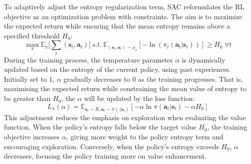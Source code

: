 To adaptively adjust the entropy regularization term, SAC reformulates the RL objective as an optimization problem with constraints. The aim is to maximize the expected return while ensuring that the mean entropy remains above a specified threshold $H_0$: $$\max_\pi\mathbb{E}_\pi \bigg[\sum_t (\mathbf{s}_t, \mathbf{a}_t)\bigg]\:s.t.\:\mathbb{E}_{(\mathbf{s}_t, \mathbf{a}_t)\sim\rho_\pi}[-\ln (\pi_t(\mathbf{a}_t|\mathbf{s}_t))] \geq H_0\;\forall t$$ During the training process, the temperature parameter $\alpha$ is dynamically updated based on the entropy of the current policy, using past experiences. Initially set to 1, $\alpha$ gradually decreases to 0 as the training progresses. That is, maximising the expected return while constraining the mean value of entropy to be greater than $H_0$, the $\alpha$ will be updated by the loss function: $$L_\pi(\alpha) = \mathbb{E}_{\mathbf{s}_t\sim R, \mathbf{a}_t\sim\pi(\cdot|\mathbf{s}_t)} [-\alpha\ln\pi(\mathbf{a}_t|\mathbf{s}_t)-\alpha H_0]$$ This adjustment reduces the emphasis on exploration when evaluating the value function. When the policy's entropy falls below the target value $H_0$, the training objective increases $\alpha$, giving more weight to the policy entropy term and encouraging exploration. Conversely, when the policy's entropy exceeds $H_0$, $\alpha$ decreases, focusing the policy training more on value enhancement.

